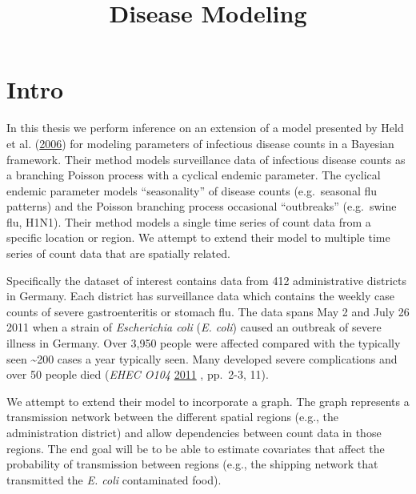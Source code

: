 \documentclass[11pt,a4paper]{article}
\title{Disease Modeling}
\author{}
\date{}
\numberwithin{equation}{section}
\begin{document}
\maketitle

\newcommand{\dw}[1]{{\color{red}{#1}}}

\hypertarget{intro}{%
\section{Intro}\label{intro}}

In this thesis we perform inference on an extension of a model presented
by Held et al. (\protect\hyperlink{ref-held_two-component_2006}{2006})
for modeling parameters of infectious disease counts in a Bayesian
framework. Their method models surveillance data of infectious disease
counts as a branching Poisson process with a cyclical endemic parameter.
The cyclical endemic parameter models ``seasonality'' of disease counts
(e.g.~seasonal flu patterns) and the Poisson branching process
occasional ``outbreaks'' (e.g.~swine flu, H1N1). Their method models a
single time series of count data from a specific location or region. We
attempt to extend their model to multiple time series of count data that
are spatially related.

Specifically the dataset of interest contains data from 412
administrative districts in Germany. Each district has surveillance data
which contains the weekly case counts of severe gastroenteritis or
stomach flu. The data spans May 2 and July 26 2011 when a strain of
\emph{Escherichia coli} (\emph{E. coli}) caused an outbreak of severe
illness in Germany. Over 3,950 people were affected compared with the
typically seen \textasciitilde{}200 cases a year typically seen. Many
developed severe complications and over 50 people died (\emph{EHEC O104}
\protect\hyperlink{ref-noauthor_ehec_2011}{2011} , pp.~2-3, 11).

We attempt to extend their model to incorporate a graph. The graph
represents a transmission network between the different spatial regions
(e.g., the administration district) and allow dependencies between count
data in those regions. The end goal will be to be able to estimate
covariates that affect the probability of transmission between regions
(e.g., the shipping network that transmitted the \emph{E. coli}
contaminated food).
\end{document}
